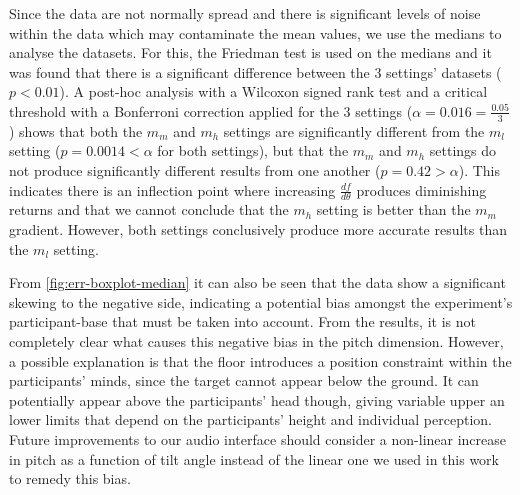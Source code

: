 \documentclass[sigconf, screen=true, anonymous=true]{acmart}
\begin{document}
Since the data are not normally spread and there is significant levels of noise within the data which may contaminate the mean values, we use the medians to analyse the datasets.
For this, the Friedman test is used on the medians and it was found that there is a significant difference between the 3 settings' datasets ($p < 0.01$).
A post-hoc analysis with a Wilcoxon signed rank test and a critical threshold with a Bonferroni correction applied for the 3 settings ($\alpha=0.016=\frac{0.05}{3}$) shows that both the $m_m$ and $m_h$ settings are significantly different from the $m_l$ setting ($p=0.0014<\alpha$ for both settings), but that the $m_m$ and $m_h$ settings do not produce significantly different results from one another ($p=0.42>\alpha$).
This indicates there is an inflection point where increasing $\frac{df}{d\theta}$ produces diminishing returns and that we cannot conclude that the $m_h$ setting is better than the $m_m$ gradient.
However, both settings conclusively produce more accurate results than the $m_l$ setting.


From \cref{fig:err-boxplot-median} it can also be seen that the data show a significant skewing to the negative side, indicating a potential bias amongst the experiment's participant-base that must be taken into account.
From the results, it is not completely clear what causes this negative bias in the pitch dimension.
However, a possible explanation is that the floor introduces a position constraint within the participants' minds, since the target cannot appear below the ground.
It can potentially appear above the participants' head though, giving variable upper an lower limits that depend on the participants' height and individual perception.
Future improvements to our audio interface should consider a non-linear increase in pitch as a function of tilt angle instead of the linear one we used in this work to remedy this bias.
\end{document}
